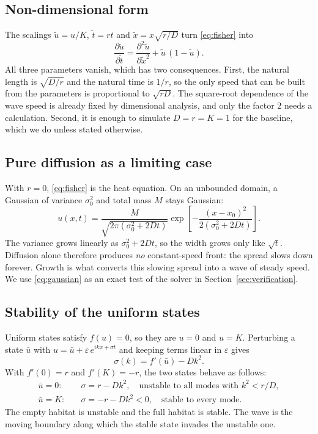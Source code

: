\documentclass[11pt,a4paper]{article}
\newcommand{\pd}[2]{\frac{\partial #1}{\partial #2}}
\newcommand{\pdd}[2]{\frac{\partial^2 #1}{\partial #2^2}}
\begin{document}
\subsection{Non-dimensional form}
The scalings $\tilde u=u/K$, $\tilde t=rt$ and $\tilde x=x\sqrt{r/D}$ turn \eqref{eq:fisher} into
\begin{equation}
  \pd{\tilde u}{\tilde t}=\pdd{\tilde u}{\tilde x}+\tilde u\,(1-\tilde u).
  \label{eq:nondim}
\end{equation}
All three parameters vanish, which has two consequences. First, the natural length is
$\sqrt{D/r}$ and the natural time is $1/r$, so the only speed that can be built from the
parameters is proportional to $\sqrt{rD}$. The square-root dependence of the wave speed is
already fixed by dimensional analysis, and only the factor $2$ needs a calculation. Second, it is
enough to simulate $D=r=K=1$ for the baseline, which we do unless stated otherwise.

\subsection{Pure diffusion as a limiting case}
With $r=0$, \eqref{eq:fisher} is the heat equation. On an unbounded domain, a Gaussian of variance
$\sigma_0^2$ and total mass $M$ stays Gaussian:
\begin{equation}
  u(x,t)=\frac{M}{\sqrt{2\pi(\sigma_0^2+2Dt)}}
  \exp\!\left[-\frac{(x-x_0)^2}{2(\sigma_0^2+2Dt)}\right].
  \label{eq:gaussian}
\end{equation}
The variance grows linearly as $\sigma_0^2+2Dt$, so the width grows only like $\sqrt{t}$. Diffusion
alone therefore produces \emph{no} constant-speed front: the spread slows down forever. Growth is what
converts this slowing spread into a wave of steady speed. We use \eqref{eq:gaussian} as an exact test
of the solver in Section~\ref{sec:verification}.

\subsection{Stability of the uniform states}
Uniform states satisfy $f(u)=0$, so they are $u=0$ and $u=K$. Perturbing a state $\bar u$ with
$u=\bar u+\varepsilon\,e^{ikx+\sigma t}$ and keeping terms linear in $\varepsilon$ gives
\begin{equation}
  \sigma(k)=f'(\bar u)-Dk^2 .
\end{equation}
With $f'(0)=r$ and $f'(K)=-r$, the two states behave as follows:
\begin{align}
  \bar u=0: &\quad \sigma=r-Dk^2, \quad\mbox{unstable to all modes with } k^2<r/D,\\
  \bar u=K: &\quad \sigma=-r-Dk^2<0, \quad\mbox{stable to every mode.}
\end{align}
The empty habitat is unstable and the full habitat is stable. The wave is the moving boundary along
which the stable state invades the unstable one.
\end{document}
